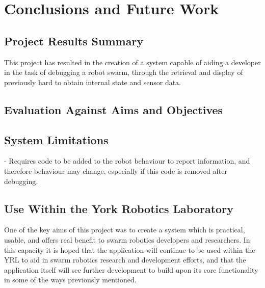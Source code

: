 
\chapter[Conclusions and Future Work]{Conclusions and Future Work} %

\label{ChapterConclusion} %


\section{Project Results Summary}
This project has resulted in the creation of a system capable of aiding a developer in the task of debugging a robot swarm, through the retrieval and display of previously hard to obtain internal state and sensor data.


\section{Evaluation Against Aims and Objectives}



\section{System Limitations}

- Requires code to be added to the robot behaviour to report information, and therefore behaviour may change, especially if this code is removed after debugging.



\section{Use Within the York Robotics Laboratory}

One of the key aims of this project was to create a system which is practical, usable, and offers real benefit to swarm robotics developers and researchers. In this capacity it is hoped that the application will continue to be used within the YRL to aid in swarm robotics research and development efforts, and that the application itself will see further development to build upon its core functionality in some of the ways previously mentioned.

